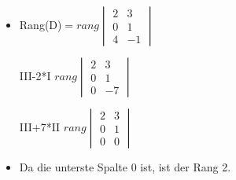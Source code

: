 \documentclass{article}
\begin{document}
\begin{itemize}
\begin{itemize}
\begin{itemize}
				\item{Rang(D)$= rang\begin{vmatrix} 2 & 3 \\ 0 & 1 \\ 4 & -1 \end{vmatrix}$}
				\item[III-2*I]{$rang \begin{vmatrix} 2 & 3 \\ 0 & 1 \\ 0 & -7 \end{vmatrix}$}
				\item[III+7*II]{$rang \begin{vmatrix} 2 & 3 \\ 0 & 1 \\ 0 & 0 \end{vmatrix}$}
				\item{Da die unterste Spalte 0 ist, ist der Rang 2.}
			\end{itemize}
		\end{itemize}
	\end{itemize}




	

	























  
\end{document}
